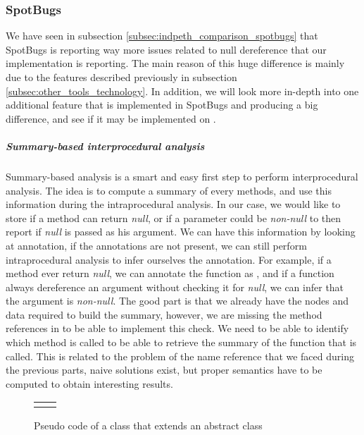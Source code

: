 \subsubsection{SpotBugs}
\label{subsec:spotbugs_specific}

We have seen in subsection \ref{subsec:indpeth_comparison_spotbugs} that SpotBugs is reporting way more issues related to null dereference that our implementation is reporting.
The main reason of this huge difference is mainly due to the features described previously in subsection \ref{subsec:other_tools_technology}.
In addition, we will look more in-depth into one additional feature that is implemented in SpotBugs and producing a big difference, and see if it may be implemented on \slang{}.

\subparagraph{Summary-based interprocedural analysis}
Summary-based analysis is a smart and easy first step to perform interprocedural analysis.
The idea is to compute a summary of every methods, and use this information during the intraprocedural analysis. 
In our case, we would like to store if a method can return \emph{null}, or if a parameter could be \emph{non-null} to then report if \emph{null} is passed as his argument.
We can have this information by looking at annotation, if the annotations are not present, we can still perform intraprocedural analysis to infer ourselves the annotation. 
For example, if a method ever return \emph{null}, we can annotate the function as \nullable{}, and if a function always dereference an argument without checking it for \emph{null}, we can infer that the argument is \emph{non-null}. 
The good part is that we already have the nodes and data required to build the summary, however, we are missing the method references in \slang{} to be able to implement this check.
We need to be able to identify which method is called to be able to retrieve the summary of the function that is called.
This is related to the problem of the name reference that we faced during the previous parts, naive solutions exist, but proper semantics have to be computed to obtain interesting results.

\begin{figure}[H]
	\centering
	\caption{Pseudo code of a class that extends an abstract class}
	\label{figure:class-extends-abtract}
	\setlength{\tabcolsep}{24pt}
	\begin{tabular}{cc}
		\multicolumn{1}{c}{} & \multicolumn{1}{c}{} \\
	\end{tabular}


\end{figure}

